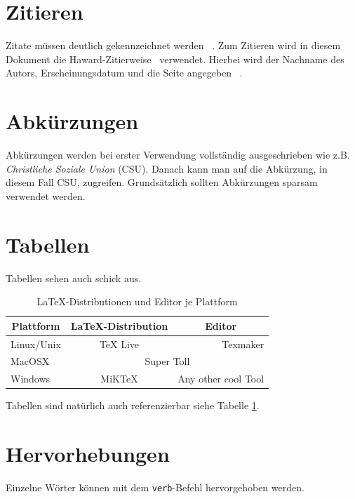 \documentclass[11pt,a4paper]{report}
\begin{document}
\section{Zitieren} \label{sec:zit}
Zitate müssen deutlich gekennzeichnet werden ~\cite[S. 12ff.]{gockel}. Zum Zitieren wird in diesem Dokument die Haward-Zitierweise~\cite[S. 12ff.]{wikiciting} verwendet. Hierbei wird der Nachname des Autors, Erscheinungsdatum und die Seite angegeben ~\cite[S. 12ff.]{wikipedia}.

\section{Abkürzungen} \label{sec:abk} Abkürzungen werden bei erster Verwendung vollständig ausgeschrieben wie z.B. \textit{Christliche Soziale Union} (CSU). Danach kann man auf die Abkürzung, in diesem Fall CSU, zugreifen. Grundsätzlich sollten Abkürzungen sparsam verwendet werden.
\newpage

\section{Tabellen} \label{sec:tab}
Tabellen sehen auch schick aus.
\begin{table}[htbp] %
\centering
\begin{tabular}{|p{4.5cm}|c|r|} %
\hline
\multicolumn{1}{|c|}{\textbf{Plattform}} & 
\multicolumn{1}{|c|}{\textbf{\LaTeX-Distribution}} & 
\multicolumn{1}{|c|}{\textbf{Editor}} \\ \hline \hline %
Linux/Unix & TeX Live & Texmaker \\\hline
MacOSX     & \multicolumn{2}{|c|}{Super Toll} \\\hline
Windows    & MiKTeX   & Any other cool Tool \\\hline   
\end{tabular}
\caption{\LaTeX-Distributionen und Editor je Plattform}
\label{tab:example1}
\end{table}
Tabellen sind natürlich auch referenzierbar siehe Tabelle \ref{tab:example1}.

\section{Hervorhebungen} \label{sec:hervorheben}
Einzelne Wörter können mit dem \verb|verb|-Befehl hervorgehoben werden.
\end{document}
